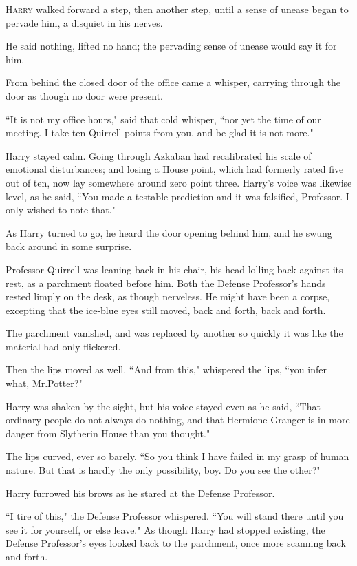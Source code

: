 
\lettrine{H}{arry} walked forward a step, then another step, until a sense of unease began to pervade him, a disquiet in his nerves.

He said nothing, lifted no hand; the pervading sense of unease would say it for him.

From behind the closed door of the office came a whisper, carrying through the door as though no door were present.

``It is not my office hours," said that cold whisper, ``nor yet the time of our meeting. I take ten Quirrell points from you, and be glad it is not more."

Harry stayed calm. Going through Azkaban had recalibrated his scale of emotional disturbances; and losing a House point, which had formerly rated five out of ten, now lay somewhere around zero point three. Harry's voice was likewise level, as he said, ``You made a testable prediction and it was falsified, Professor. I only wished to note that."

As Harry turned to go, he heard the door opening behind him, and he swung back around in some surprise.

Professor Quirrell was leaning back in his chair, his head lolling back against its rest, as a parchment floated before him. Both the Defense Professor's hands rested limply on the desk, as though nerveless. He might have been a corpse, excepting that the ice-blue eyes still moved, back and forth, back and forth.

The parchment vanished, and was replaced by another so quickly it was like the material had only flickered.

Then the lips moved as well. ``And from this," whispered the lips, ``you infer what, Mr.\?Potter?"

Harry was shaken by the sight, but his voice stayed even as he said, ``That ordinary people do not always do nothing, and that Hermione Granger is in more danger from Slytherin House than you thought."

The lips curved, ever so barely. ``So you think I have failed in my grasp of human nature. But that is hardly the only possibility, boy. Do you see the other?"

Harry furrowed his brows as he stared at the Defense Professor.

``I tire of this," the Defense Professor whispered. ``You will stand there until you see it for yourself, or else leave." As though Harry had stopped existing, the Defense Professor's eyes looked back to the parchment, once more scanning back and forth.

